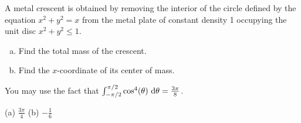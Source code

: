 \begin{question}[M200 2012D] %
A metal crescent is obtained by removing the interior of the circle defined by 
the equation $x^2 + y^2 = x$ from the metal plate of constant density 1 
occupying the unit disc $x^2 + y^2 \le 1$.
\begin{enumerate}[(a)]
\item
Find the total mass of the crescent.
\item
Find the $x$-coordinate of its center of mass.
\end{enumerate}

You may use the fact that 
$\int_{-\pi/2}^{\pi/2}\cos^4(\theta)\ \dee{\theta}=\frac{3\pi}{8}$.
\end{question}

%

\begin{answer}
(a) $\frac{3\pi}{4}$\qquad
(b) $-\frac{1}{6}$
\end{answer}

